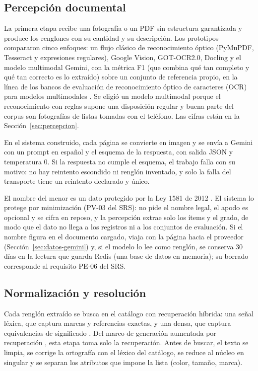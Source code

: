 \subsection{Percepción documental}
\label{sec:percepcion-dev}

La primera etapa recibe una fotografía o
un PDF sin estructura garantizada y produce los renglones con su cantidad y su descripción. Los prototipos compararon cinco enfoques: un flujo clásico de reconocimiento
óptico (PyMuPDF, Tesseract y expresiones regulares), Google Vision, GOT-OCR2.0, Docling y el modelo
multimodal Gemini, con la métrica F1 (que combina qué tan completo y qué tan correcto es lo extraído)
sobre un conjunto de referencia propio, en la línea de los bancos de evaluación de reconocimiento
óptico de caracteres (OCR) para modelos multimodales \citep{liu_ocrbench_2024,shen_ocr_2026}. Se eligió un modelo multimodal porque el
reconocimiento con reglas supone una disposición regular y buena parte del corpus son fotografías de
listas tomadas con el teléfono. Las cifras están en la
Sección~\ref{sec:percepcion}.

En el sistema construido, cada página se convierte en imagen y se envía a Gemini con un prompt en
español y el esquema de la respuesta, con salida JSON y temperatura 0. Si la respuesta no cumple el
esquema, el trabajo falla con su motivo: no hay reintento escondido ni renglón inventado, y solo la
falla del transporte tiene un reintento declarado y único.

El nombre del menor es un dato protegido por la Ley 1581 de 2012 \citep{congreso_ley1581_2012}. El
sistema lo protege por minimización (PV-03 del SRS): no pide el nombre legal, el apodo es opcional y se cifra en reposo,
y la percepción extrae solo los ítems y el grado, de modo que el dato no llega a los registros ni a los conjuntos de evaluación.
Si el nombre figura en el documento cargado, viaja con la página hacia el proveedor (Sección~\ref{sec:datos-gemini}) y, si el modelo lo lee como renglón, se conserva 30 días en
la lectura que guarda Redis (una base de datos en memoria); su borrado corresponde al requisito PE-06 del SRS.

\subsection{Normalización y resolución}
\label{sec:normalizacion}

Cada renglón extraído se busca en el catálogo con recuperación híbrida: una señal léxica, que captura
marcas y referencias exactas, y una densa, que captura equivalencias de significado
\citep{reimers_sentence-bert_2019,karpukhin_dense_2020}. Del marco de generación aumentada por
recuperación \citep{lewis_retrieval-augmented_2020}, esta etapa toma solo la recuperación. Antes de
buscar, el texto se limpia, se corrige la ortografía con el léxico del catálogo, se reduce al núcleo
en singular y se separan los atributos que impone la lista (color, tamaño, marca).

